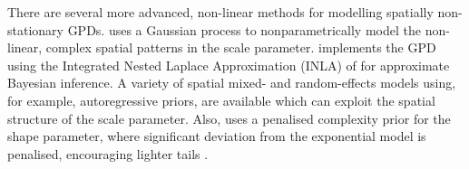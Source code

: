 \documentclass{article}
\numberwithin{equation}{section}
\begin{document}


There are several more advanced, non-linear methods for modelling spatially non-stationary GPDs.
\citet{Cooley2007} uses a Gaussian process to nonparametrically model the non-linear, complex spatial patterns in the scale parameter.
\citet{Opitz2018} implements the GPD using the Integrated Nested Laplace Approximation (INLA) of \citet{Rue2009} for approximate Bayesian inference.
A variety of spatial mixed- and random-effects models using, for example, autoregressive priors, are available which can exploit the spatial structure of the scale parameter.
Also, \citet{Opitz2018} uses a penalised complexity prior for the shape parameter, where significant deviation from the exponential model is penalised, encouraging lighter tails \citep{Simpson2015}.
\end{document}
